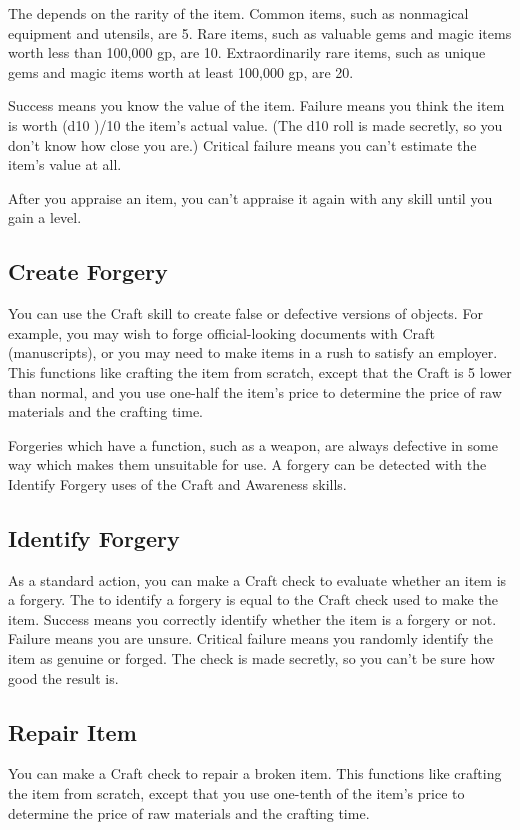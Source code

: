         The  depends on the rarity of the item. Common items, such as nonmagical equipment and utensils, are  5. Rare items, such as valuable gems and magic items worth less than 100,000 gp, are  10. Extraordinarily rare items, such as unique gems and magic items worth at least 100,000 gp, are  20.

        Success means you know the value of the item. Failure means you think the item is worth (d10 )/10 \x the item's actual value. (The d10 roll is made secretly, so you don't know how close you are.) Critical failure means you can't estimate the item's value at all.

        After you appraise an item, you can't appraise it again with any skill until you gain a level.

    \subsection{Create Forgery}
        You can use the Craft skill to create false or defective versions of objects. For example, you may wish to forge official-looking documents with Craft (manuscripts), or you may need to make items in a rush to satisfy an employer. This functions like crafting the item from scratch, except that the Craft  is 5 lower than normal, and you use one-half the item's price to determine the price of raw materials and the crafting time.

        Forgeries which have a function, such as a weapon, are always defective in some way which makes them unsuitable for use. A forgery can be detected with the Identify Forgery uses of the Craft and Awareness skills.

    \subsection{Identify Forgery}
        As a standard action, you can make a Craft check to evaluate whether an item is a forgery. The  to identify a forgery is equal to the Craft check used to make the item. Success means you correctly identify whether the item is a forgery or not. Failure means you are unsure. Critical failure means you randomly identify the item as genuine or forged. The check is made secretly, so you can't be sure how good the result is.

    \subsection{Repair Item}
        You can make a Craft check to repair a broken item. This functions like crafting the item from scratch, except that you use one-tenth of the item's price to determine the price of raw materials and the crafting time.

